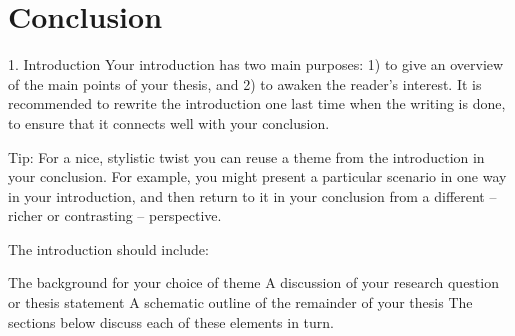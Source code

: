 \chapter{Conclusion}

1. Introduction
Your introduction has two main purposes: 1) to give an overview of the main points of your thesis, and 2) to awaken the reader’s interest. It is recommended to rewrite the introduction one last time when the writing is done, to ensure that it connects well with your conclusion.

Tip: For a nice, stylistic twist you can reuse a theme from the introduction in your conclusion. For example, you might present a particular scenario in one way in your introduction, and then return to it in your conclusion from a different – richer or contrasting – perspective.

The introduction should include:

The background for your choice of theme
A discussion of your research question or thesis statement
A schematic outline of the remainder of your thesis
The sections below discuss each of these elements in turn.
